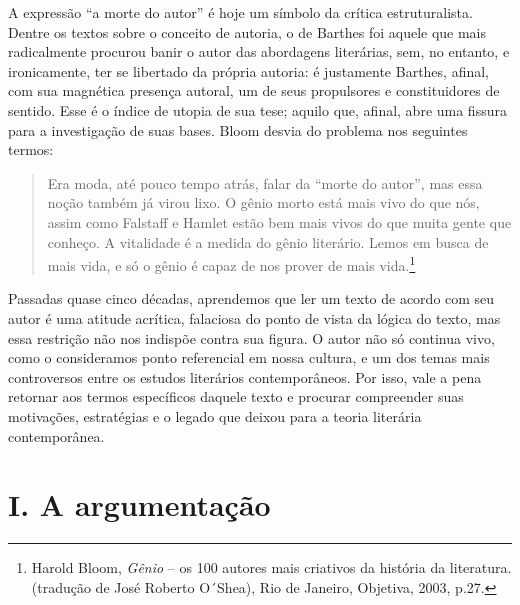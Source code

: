 A expressão ``a morte do autor'' é hoje um símbolo da crítica
estruturalista. Dentre os textos sobre o conceito de autoria, o de
Barthes foi aquele que mais radicalmente procurou banir o autor das
abordagens literárias, sem, no entanto, e ironicamente, ter se libertado
da própria autoria: é justamente Barthes, afinal, com sua magnética
presença autoral, um de seus propulsores e constituidores de sentido.
Esse é o índice de utopia de sua tese; aquilo que, afinal, abre uma
fissura para a investigação de suas bases. Bloom desvia do problema nos
seguintes termos:

\begin{quote}
Era moda, até pouco tempo atrás, falar da ``morte do autor'', mas essa
noção também já virou lixo. O gênio morto está mais vivo do que nós,
assim como Falstaff e Hamlet estão bem mais vivos do que muita gente que
conheço. A vitalidade é a medida do gênio literário. Lemos em busca de
mais vida, e só o gênio é capaz de nos prover de mais vida.\footnote{Harold
  Bloom, \emph{Gênio} -- os 100 autores mais criativos da história da
  literatura. (tradução de José Roberto O´Shea), Rio de Janeiro,
  Objetiva, 2003, p.27.}
\end{quote}

Passadas quase cinco décadas, aprendemos que ler um texto de acordo com
seu autor é uma atitude acrítica, falaciosa do ponto de vista da lógica
do texto, mas essa restrição não nos indispõe contra sua figura. O autor
não só continua vivo, como o consideramos ponto referencial em nossa
cultura, e um dos temas mais controversos entre os estudos literários
contemporâneos. Por isso, vale a pena retornar aos termos específicos
daquele texto e procurar compreender suas motivações, estratégias e o
legado que deixou para a teoria literária contemporânea.

\section*{I. A argumentação}

